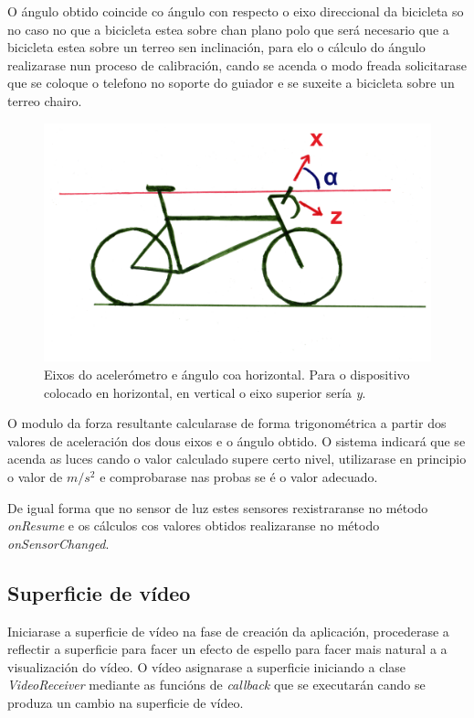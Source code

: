 O ángulo obtido coincide co ángulo con respecto o eixo direccional da bicicleta so no caso no que a bicicleta estea sobre chan plano polo que será necesario que a bicicleta estea sobre un terreo sen inclinación, para elo o cálculo do ángulo realizarase nun proceso de calibración, cando se acenda o modo freada solicitarase que se coloque o telefono no soporte do guiador e se suxeite a bicicleta sobre un terreo chairo.
\begin{figure}[tb]
  \centering
  \includegraphics[scale=.6]{imaxes/angulo.png}
  \caption{Eixos do acelerómetro e ángulo coa horizontal. Para o dispositivo colocado en horizontal, en vertical o eixo superior sería \emph{y}.}
  \label{fig:angulo}
\end{figure}

O modulo da forza resultante calcularase de forma trigonométrica a partir dos valores de aceleración dos dous eixos e o ángulo obtido. O sistema indicará que se acenda as luces cando o valor calculado supere certo nivel, utilizarase en principio o valor de $m/s^2$ e comprobarase nas probas se é o valor adecuado.

De igual forma que no sensor de luz estes sensores rexistraranse no método \emph{onResume} e os cálculos cos valores obtidos realizaranse no método \emph{onSensorChanged}.

\subsection{Superficie de vídeo}
Iniciarase a superficie de vídeo na fase de creación da aplicación, procederase a reflectir a superficie para facer un efecto de espello para facer mais natural a a visualización do vídeo. O vídeo asignarase a superficie iniciando a clase \emph{VideoReceiver} mediante as funcións de \emph{callback} que se executarán cando se produza un cambio na superficie de vídeo.

